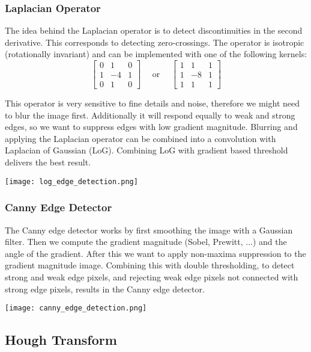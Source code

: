\subsubsection{Laplacian Operator}

The idea behind the Laplacian operator is to detect discontinuities in the second derivative. This corresponds to detecting zero-crossings. The operator is isotropic (rotationally invariant) and can be implemented with one of the following kernels:
$$
\begin{bmatrix}
    0 & 1 & 0\\
    1 & -4 & 1\\
    0 & 1 & 0
\end{bmatrix}
\quad
\text{ or }
\quad
\begin{bmatrix}
    1 & 1 & 1\\
    1 & -8 & 1\\
    1 & 1 & 1
\end{bmatrix}
$$

This operator is very sensitive to fine details and noise, therefore we might need to blur the image first. Additionally it will respond equally to weak and strong edges, so we want to suppress edges with low gradient magnitude. Blurring and applying the Laplacian operator can be combined into a convolution with Laplacian of Gaussian (LoG). Combining LoG with gradient based threshold delivers the best result.
\begin{center}
	\texttt{[image: log\_edge\_detection.png]}
\end{center}

\subsubsection{Canny Edge Detector}

The Canny edge detector works by first smoothing the image with a Gaussian filter. Then we compute the gradient magnitude (Sobel, Prewitt, ...) and the angle of the gradient. After this we want to apply non-maxima suppression to the gradient magnitude image. Combining this with double thresholding, to detect strong and weak edge pixels, and rejecting weak edge pixels not connected with strong edge pixels, results in the Canny edge detector.
\begin{center}
	\texttt{[image: canny\_edge\_detection.png]}
\end{center}


\subsection{Hough Transform}

